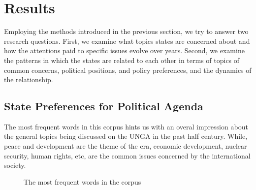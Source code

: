 \documentclass[final,authoryear,3p,12pt,times,hidelinks]{elsarticle}
\begin{document}
\section{Results}
\label{sec:Results}
Employing the methods introduced in the previous section, we try to answer two research questions. First, we examine what topics states are concerned about and how the attentions paid to specific issues evolve over years. Second, we examine the patterns in which the states are related to each other in terms of topics of common concerns, political positions, and policy preferences, and the dynamics of the relationship. 

\subsection{State Preferences for Political Agenda}
The most frequent words in this corpus hints us with an overal impression about the general topics being discussed on the UNGA in the past half century. While, peace and development are the theme of the era, economic development, nuclear security, human rights, etc, are the common issues concerned by the international society. 

\begin{figure}[ht!]
  \centering
  \quad
  \caption{The most frequent words in the corpus}
  \label{fig:freq words}
\end{figure}
\end{document}
